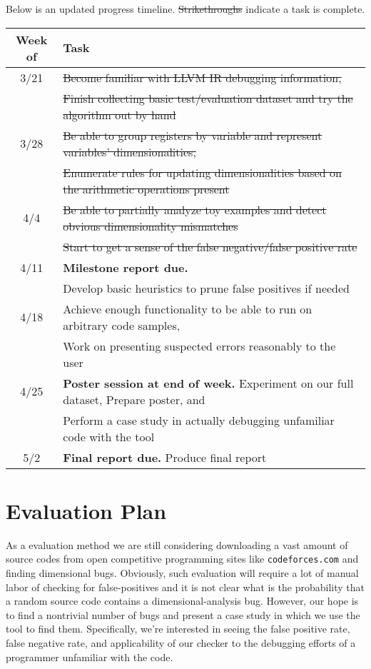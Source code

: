 \documentclass[12pt]{article}
\begin{document}
Below is an updated progress timeline.
\sout{Strikethroughs} indicate a task is complete.

\noindent
\begin{tabular}{c | l}
Week of & Task \\
\hline
3/21 & \sout{Become familiar with LLVM IR debugging information,} \\
& \sout{Finish collecting basic test/evaluation dataset and try the algorithm out by hand} \\
3/28 & \sout{Be able to group registers by variable and represent variables' dimensionalities,} \\
& \sout{Enumerate rules for updating dimensionalities based on the arithmetic operations present} \\
4/4 & \sout{Be able to partially analyze toy examples and detect obvious dimensionality mismatches} \\
& \sout{Start to get a sense of the false negative/false positive rate} \\
4/11 & \textbf{Milestone report due.} \\
& Develop basic heuristics to prune false positives if needed \\
4/18 & Achieve enough functionality to be able to run on arbitrary code samples, \\
& Work on presenting suspected errors reasonably to the user \\
4/25 & \textbf{Poster session at end of week.} Experiment on our full dataset, Prepare poster, and \\
& Perform a case study in actually debugging unfamiliar code with the tool \\
5/2 & \textbf{Final report due.} Produce final report
\end{tabular}

\section{Evaluation Plan}

As a evaluation method we are still considering downloading a vast amount of source codes from open competitive programming sites like \texttt{codeforces.com} and finding dimensional bugs.
Obviously, such evaluation will require a lot of manual labor of checking for false-positives and it is not clear what is the probability that a random source code contains a dimensional-analysis bug. However, our hope is to find a nontrivial number of bugs and present a case study in which we use the tool to find them.
Specifically, we're interested in seeing the false positive rate, false negative rate, and applicability of our checker to the debugging efforts of a programmer unfamiliar with the code.
\end{document}
